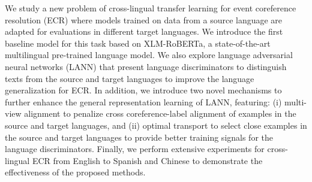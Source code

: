 We study a new problem of cross-lingual transfer learning for event coreference resolution (ECR) where models trained on data from a source language are adapted for evaluations in different target languages. We introduce the first baseline model for this task based on XLM-RoBERTa, a state-of-the-art multilingual pre-trained language model. We also explore language adversarial neural networks (LANN) that present language discriminators to distinguish texts from the source and target languages to improve the language generalization for ECR. In addition, we introduce two novel mechanisms to further enhance the general representation learning of LANN, featuring: (i) multi-view alignment to penalize cross coreference-label alignment of examples in the source and target languages, and (ii) optimal transport to select close examples in the source and target languages to provide better training signals for the language discriminators. Finally, we perform extensive experiments for cross-lingual ECR from English to Spanish and Chinese to demonstrate the effectiveness of the proposed methods.
